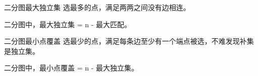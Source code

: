 二分图最大独立集
选最多的点，满足两两之间没有边相连。

二分图中，最大独立集 = n - 最大匹配。

二分图最小点覆盖
选最少的点，满足每条边至少有一个端点被选，不难发现补集是独立集。

二分图中，最小点覆盖 = n - 最大独立集。